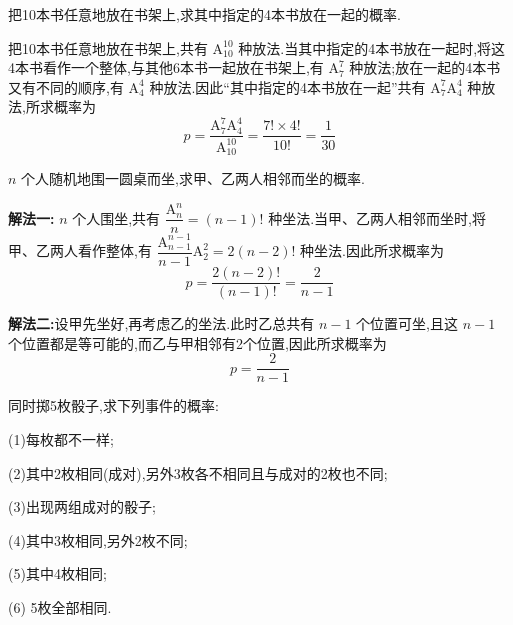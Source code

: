 \question 把10本书任意地放在书架上,求其中指定的4本书放在一起的概率.

\begin{solution}
    把10本书任意地放在书架上,共有 $\mathrm{A}_{10}^{10}$ 种放法.当其中指定的4本书放在一起时,将这4本书看作一个整体,与其他6本书一起放在书架上,有 $\mathrm{A}_7^7$ 种放法;放在一起的4本书又有不同的顺序,有 $\mathrm{A}_4^4$ 种放法.因此``其中指定的4本书放在一起''共有 $\mathrm{A}_7^7 \mathrm{A}_4^4$ 种放法,所求概率为
    $$
    p = \dfrac{\mathrm{A}_7^7 \mathrm{A}_4^4}{\mathrm{A}_{10}^{10}} = \dfrac{7! \times 4!}{10!} = \dfrac{1}{30}
    $$
\end{solution}

\question $n$ 个人随机地围一圆桌而坐,求甲、乙两人相邻而坐的概率.

\begin{solution}

    \textbf{解法一:} $n$ 个人围坐,共有 $\dfrac{\mathrm{A}_n^n}{n} = (n-1)!$ 种坐法.当甲、乙两人相邻而坐时,将甲、乙两人看作整体,有 $\dfrac{\mathrm{A}_{n-1}^{n-1}}{n-1} \mathrm{A}_2^2 = 2(n-2)!$ 种坐法.因此所求概率为
    $$
    p = \dfrac{2(n-2)!}{(n-1)!} = \dfrac{2}{n-1}
    $$

    \textbf{解法二:}设甲先坐好,再考虑乙的坐法.此时乙总共有 $n-1$ 个位置可坐,且这 $n-1$ 个位置都是等可能的,而乙与甲相邻有2个位置,因此所求概率为
    $$
    p = \dfrac{2}{n-1}
    $$
\end{solution}

\question 同时掷5枚骰子,求下列事件的概率:

(1)每枚都不一样;

(2)其中2枚相同(成对),另外3枚各不相同且与成对的2枚也不同;

(3)出现两组成对的骰子;

(4)其中3枚相同,另外2枚不同;

(5)其中4枚相同;

(6) 5枚全部相同.

